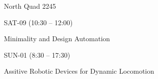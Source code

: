 \documentclass{article}
\begin{document}
\rssheader[2in]

\rssbig
\begin{center}
North Quad 2245
\end{center}

\vfill

\rssmed
\begin{center}
SAT-09 (10:30 -- 12:00)
\end{center}

\rsssm
\begin{center}
Minimality and Design Automation
\end{center}

\vfill

\rssmed
\begin{center}
SUN-01 (8:30 -- 17:30)
\end{center}

\rsssm
\begin{center}
Assitive Robotic Devices for Dynamic Locomotion
\end{center}

\vfill
\end{document}
